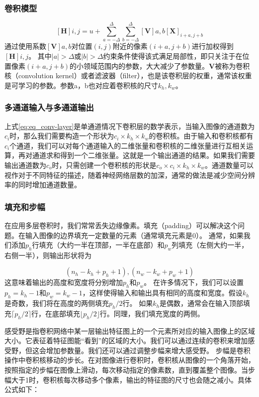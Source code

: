 \subsubsection{卷积模型}
\begin{equation}
  \label{eq:eq_conv-layer}
  [\mathbf{H}]{i, j} = u + \sum_{a = -\Delta}^{\Delta} \sum_{b = -\Delta}^{\Delta} [\mathbf{V }]{a, b} [\mathbf{X}]_{i+a, j+b}
\end{equation}
通过使用系数$[\mathbf{V}]{a, b}$对位置$(i, j)$附近的像素$(i+a, j+b)$进行加权得到$[\mathbf{H}]{i, j}$。 其中$|a|> \Delta$或$|b| > \Delta$约束条件使得该式满足局部性，即只关注于在位置像素$(i+a, j+b)$的小领域范围内的参数，大大减少了参数量。$\mathbf{V}$被称为卷积核（convolution kernel）或者滤波器（filter），也是该卷积层的权重，通常该权重是可学习的参数。参数a，b也对应着卷积核的尺寸$k_h,k_w$。
\subsubsection{多通道输入与多通道输出}
上式\eqref{eq:eq_conv-layer}是单通道情况下卷积层的数学表示，当输入图像的通道数为$c_i$时，那么我们需要构造一个形状为$c_i\times k_h\times k_w$的卷积核。由于输入和卷积核都有$c_i$个通道，我们可以对每个通道输入的二维张量和卷积核的二维张量进行互相关运算，再对通道求和得到一个二维张量。这就是一个输出通道的结果。如果我们需要输出通道数为$c_o$时，只需创建一个卷积核的形状是$c_o\times c_i\times k_h\times k_w$。通道数量可以视作对于不同特征的描述，随着神经网络层数的加深，通常的做法是减少空间分辨率的同时增加通道数量。
\subsubsection{填充和步幅}
在应用多层卷积时，我们常常丢失边缘像素。填充（padding）可以解决这个问题。在输入图像的边界填充一定数量的元素（通常填充元素是$0$）。  
通常，如果我们添加$p_h$行填充（大约一半在顶部，一半在底部）和$p_w$列填充（左侧大约一半，右侧一半），则输出形状将为

\begin{equation}
  (n_h-k_h+p_h+1),(n_w-k_w+p_w+1)
\end{equation}
这意味着输出的高度和宽度将分别增加$p_h$和$p_w$。
在许多情况下，我们可以设置$p_h=k_h-1$和$p_w=k_w-1$，这样使得输入和输出具有相同的高度和宽度。假设$k_h$是奇数，我们将在高度的两侧填充$p_h/2$行。 如果$k_h$是偶数，通常会在输入顶部填充$\lceil p_h/2\rceil$行，在底部填充$\lfloor p_h/2\rfloor$行。同理，我们填充宽度的两侧。

感受野是指卷积网络中某一层输出特征图上的一个元素所对应的输入图像上的区域大小。它表征着特征图能“看到”的区域的大小。我们可以通过连续的卷积来增加感受野，但这会增加参数量。我们还可以通过调整步幅来增大感受野。
步幅是卷积操作中卷积核移动的步长。在对图像进行卷积时，卷积核从图像的一个角落开始，按照指定的步幅在图像上滑动，每次移动指定的像素数，直到覆盖整个图像。当步幅大于1时，卷积核每次移动多个像素，输出的特征图的尺寸也会随之减小。具体公式如下：

